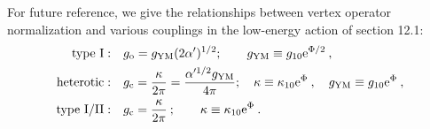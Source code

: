 For future reference, we give the relationships between vertex operator normalization and various couplings in the low-energy action of section 12.1:
\begin{subequations}
	\begin{align}
		\text{type I}:&\quad g_{\mathrm{o}}=g_{\mathrm{YM}}(2\alpha^{\prime})^{1/2}; \qquad 
		g_{\mathrm{YM}}\equiv g_{10}\mathrm{e}^{\Phi/2} \:, \label{12.3.47a} \\
		\text{heterotic}:&\quad g_{\mathrm{c}}=\frac{\kappa}{2\pi}=\frac{\alpha^{\prime1/2}g_{\mathrm{YM}}}{4\pi};
		\quad \kappa\equiv \kappa_{10}\mathrm{e}^{\Phi}\:,\quad g_{\mathrm{YM}}\equiv g_{10}\mathrm{e}^{\Phi}\:,\label{12.3.47b} \\
		\text{type I/II}:&\quad g_{\mathrm{c}}=\frac{\kappa}{2\pi}\:; \qquad \kappa\equiv \kappa_{10}\mathrm{e}^{\Phi}\:.\label{12.3.47c} 
	\end{align} \label{12.3.47}
\end{subequations}

